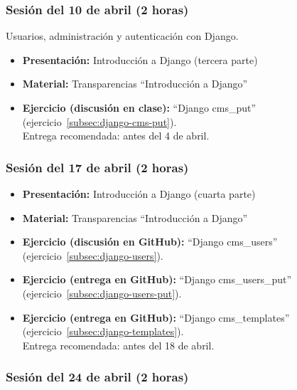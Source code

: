 \documentclass[a4paper,12pt]{article}
\begin{document}
\subsubsection{Sesión del 10 de abril (2 horas)}

Usuarios, administración y autenticación con Django.

\begin{itemize}
 \item \textbf{Presentación:} Introducción a Django (tercera parte)
 \item \textbf{Material:} Transparencias ``Introducción a Django''
  \item \textbf{Ejercicio (discusión en clase):} ``Django cms\_put'' (ejercicio~\ref{subsec:django-cms-put}). \\
 Entrega recomendada: antes del 4 de abril.
\end{itemize}


\subsubsection{Sesión del 17 de abril (2 horas)}

\begin{itemize}
 \item \textbf{Presentación:} Introducción a Django (cuarta parte)
 \item \textbf{Material:} Transparencias ``Introducción a Django''
  \item \textbf{Ejercicio (discusión en GitHub):} ``Django cms\_users'' (ejercicio~\ref{subsec:django-users}).
  \item \textbf{Ejercicio (entrega en GitHub):} ``Django cms\_users\_put'' (ejercicio~\ref{subsec:django-users-put}).
 \item \textbf{Ejercicio (entrega en GitHub):} ``Django cms\_templates'' (ejercicio~\ref{subsec:django-templates}). \\
  Entrega recomendada: antes del 18 de abril.
\end{itemize}


\subsubsection{Sesión del 24 de abril (2 horas)}
\end{document}
